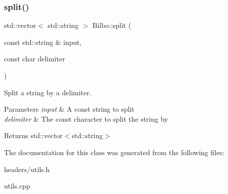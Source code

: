 \subsubsection{split()}
{\footnotesize\ttfamily std\+::vector$<$ std\+::string $>$ Bilbo\+::split (\begin{DoxyParamCaption}\item[{const std\+::string \&}]{input,  }\item[{const char}]{delimiter }\end{DoxyParamCaption})}



Split a string by a delimiter. 


\begin{DoxyParams}{Parameters}
{\em input} & A const string to split \\
\hline
{\em delimiter} & The const character to split the string by \\
\hline
\end{DoxyParams}
\begin{DoxyReturn}{Returns}
std\+::vector$<$std\+::string$>$ 
\end{DoxyReturn}


The documentation for this class was generated from the following files\+:\begin{DoxyCompactItemize}
\item 
headers/utils.\+h\item 
utils.\+cpp\end{DoxyCompactItemize}
